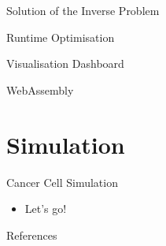 \documentclass[table, aspectratio=169]{beamer}
\begin{document}
  \begin{frame}{Solution of the Inverse Problem}
  \end{frame}

  \begin{frame}{Runtime Optimisation}

  \end{frame}

  \begin{frame}{Visualisation Dashboard}

  \end{frame}
  \begin{frame}{WebAssembly}
  \end{frame}

  \section{Simulation}
  \begin{frame}{Cancer Cell Simulation}
    \begin{itemize}
      \item Let's go!
    \end{itemize}
  \end{frame}

  \begin{frame}[allowframebreaks]{References}
    \printbibliography
  \end{frame}
\end{document}
